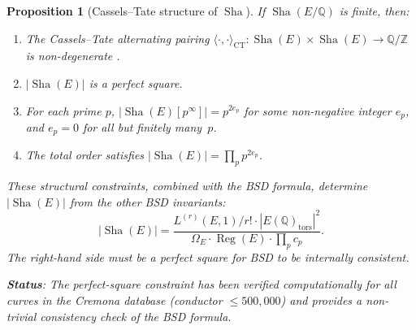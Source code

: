 \documentclass[11pt]{article}
\newtheorem{proposition}[theorem]{Proposition}
\DeclareMathOperator{\Reg}{Reg}
\DeclareMathOperator{\Sha}{Sha}
\begin{document}
\begin{proposition}[Cassels--Tate structure of $\Sha$]
\label{prop:cassels-tate}
If $\Sha(E/\mathbb{Q})$ is finite, then:
\begin{enumerate}
  \item The Cassels--Tate alternating pairing
    $\langle\cdot,\cdot\rangle_{\mathrm{CT}} : \Sha(E) \times \Sha(E) \to
    \mathbb{Q}/\mathbb{Z}$ is non-degenerate \cite{Cassels}.
  \item $|\Sha(E)|$ is a perfect square.
  \item For each prime $p$, $|\Sha(E)[p^\infty]| = p^{2e_p}$ for some
    non-negative integer $e_p$, and $e_p = 0$ for all but finitely many~$p$.
  \item The total order satisfies $|\Sha(E)| = \prod_p p^{2e_p}$.
\end{enumerate}
These structural constraints, combined with the BSD formula, determine
$|\Sha(E)|$ from the other BSD invariants:
\[
  |\Sha(E)| = \frac{L^{(r)}(E,1)/r! \cdot |E(\mathbb{Q})_{\mathrm{tors}}|^2}
               {\Omega_E \cdot \Reg(E) \cdot \prod_p c_p}.
\]
The right-hand side must be a perfect square for BSD to be internally
consistent.

\textbf{Status}: The perfect-square constraint has been verified computationally
for all curves in the Cremona database \cite{Cremona} (conductor $\leq 500{,}000$)
and provides a non-trivial consistency check of the BSD formula.
\end{proposition}
\end{document}
